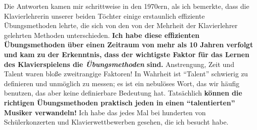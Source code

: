 Die Antworten kamen mir schrittweise in den 1970ern, als ich bemerkte, dass die Klavierlehrerin unserer beiden Töchter einige erstaunlich effiziente Übungsmethoden lehrte, die sich von den von der Mehrheit der Klavierlehrer gelehrten Methoden unterschieden.
 \textbf{Ich habe diese effizienten Übungsmethoden über einen Zeitraum von mehr als 10 Jahren verfolgt und kam zu der Erkenntnis, dass der wichtigste Faktor für das Lernen des Klavierspielens die \textit{Übungsmethoden} sind.}
 Anstrengung, Zeit und Talent waren bloße zweitrangige Faktoren!
 In Wahrheit ist \enquote{Talent} schwierig zu definieren und unmöglich zu messen; es ist ein nebulöses Wort, das wir häufig benutzen, das aber keine definierbare Bedeutung hat.
 Tatsächlich \textbf{können die richtigen Übungsmethoden praktisch jeden in einen \enquote{talentierten} Musiker verwandeln!}
 Ich habe das jedes Mal bei hunderten von Schülerkonzerten und Klavierwettbewerben gesehen, die ich besucht habe.
 

